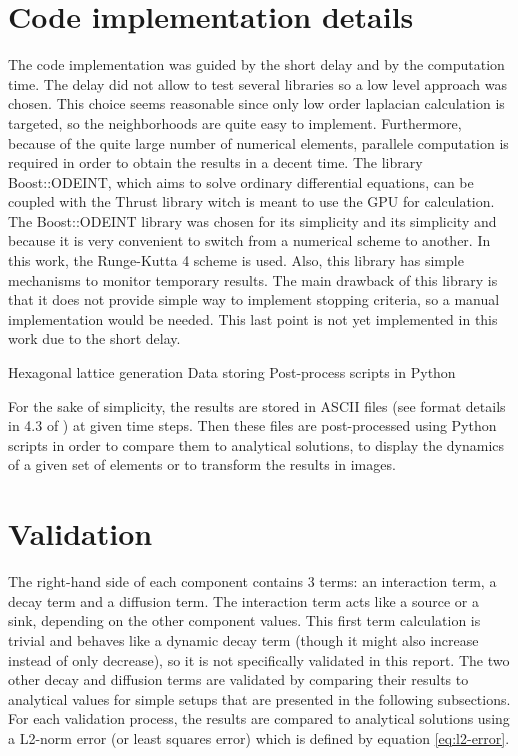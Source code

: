 \documentclass[a4paper]{article}
\begin{document}
\section{Code implementation details}

The code implementation was guided by the short delay and by the computation time. The delay did not allow to test several libraries so a low level approach was chosen. This choice seems reasonable since only low order laplacian calculation is targeted, so the neighborhoods are quite easy to implement. Furthermore, because of the quite large number of numerical elements, parallele computation is required in order to obtain the results in a decent time. The library Boost::ODEINT, which aims to solve ordinary differential equations, can be coupled with the Thrust library witch is meant to use the GPU for calculation. The Boost::ODEINT library was chosen for its simplicity and its simplicity and because it is very convenient to switch from a numerical scheme to another. In this work, the Runge-Kutta 4 scheme is used. Also, this library has simple mechanisms to monitor temporary results. The main drawback of this library is that it does not provide simple way to implement stopping criteria, so a manual implementation would be needed. This last point is not yet implemented in this work due to the short delay.

Hexagonal lattice generation
Data storing
Post-process scripts in Python

For the sake of simplicity, the results are stored in ASCII files (see format details in 4.3 of \cite{tecplot_dataformat_guide}) at given time steps. Then these files are post-processed using Python scripts in order to compare them to analytical solutions, to display the dynamics of a given set of elements or to transform the results in images.

\section{Validation}

The right-hand side of each component contains 3 terms: an interaction term, a decay term and a diffusion term. The interaction term acts like a source or a sink, depending on the other component values. This first term calculation is trivial and behaves like a dynamic decay term (though it might also increase instead of only decrease), so it is not specifically validated in this report. The two other decay and diffusion terms are validated by comparing their results to analytical values for simple setups that are presented in the following subsections. For each validation process, the results are compared to analytical solutions using a L2-norm error (or least squares error) which is defined by equation \ref{eq:l2-error}.
\end{document}
